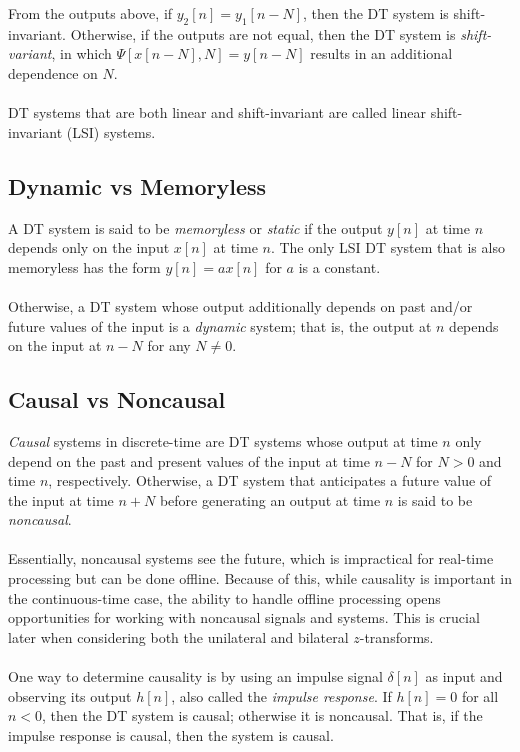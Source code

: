 \documentclass{report}
\begin{document}
From the outputs above, if $y_2[n]=y_1[n-N]$, then the DT system is shift-invariant. Otherwise, if the outputs are not equal, 
then the DT system is \emph{shift-variant}, in which $\Psi[x[n-N],N]=y[n-N]$ results in an additional dependence on $N$.
\\ \\
DT systems that are both linear and shift-invariant are called linear shift-invariant (LSI) systems.

\subsection{Dynamic vs Memoryless}
A DT system is said to be \emph{memoryless} or \emph{static} if the output $y[n]$ at time $n$ depends only on the input $x[n]$ at time $n$. The only LSI DT system 
that is also memoryless has the form $y[n]=ax[n]$ for $a$ is a constant. \\ \\
Otherwise, a DT system whose output additionally depends on past and/or future values of the input is a \emph{dynamic} system; that is, the output at $n$ 
depends on the input at $n-N$ for any $N\neq 0$. 

\subsection{Causal vs Noncausal}
\emph{Causal} systems in discrete-time are DT systems whose output at time $n$ only depend on the past and present values of the input at time $n-N$ for $N>0$ and time $n$, respectively. 
Otherwise, a DT system that anticipates a future value of the input at time $n+N$ before generating an output at time $n$ is said to be \emph{noncausal}.
\\ \\
Essentially, noncausal systems see the future, which is impractical for real-time processing but can be done offline. Because of this, while causality is important in the continuous-time case, 
the ability to handle offline processing opens opportunities for working with noncausal signals and systems. This is crucial later when considering both the unilateral and bilateral $z$-transforms.
\\ \\
One way to determine causality is by using an impulse signal $\delta[n]$ as input and observing its output $h[n]$, also called the \emph{impulse response}. If $h[n]=0$ for all $n<0$, 
then the DT system is causal; otherwise it is noncausal. That is, if the impulse response is causal, then the system is causal.
\end{document}
